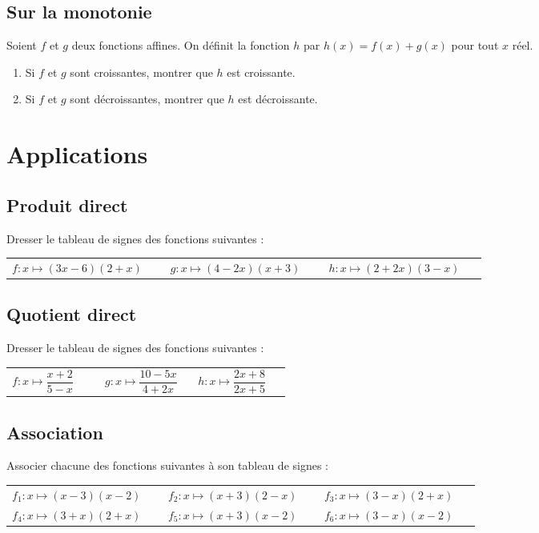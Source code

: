 \documentclass[oneside,12pt]{article}          %
\begin{document}
\subsection{Sur la monotonie}
Soient $f$ et $g$ deux fonctions affines. On définit la fonction $h$ par $h(x)=f(x)+g(x)$ pour tout $x$ réel.
\begin{enumerate}
	\item Si $f$ et $g$ sont croissantes, montrer que $h$ est croissante.
	\item Si $f$ et $g$ sont décroissantes, montrer que $h$ est décroissante.
\end{enumerate}



\section{Applications}

\subsection{Produit direct}
Dresser le tableau de signes des fonctions suivantes :

\begin{tabular}{p{0.3\linewidth} p{0.3\linewidth} p{0.3\linewidth}}
$f:x\mapsto (3x-6)(2+x)$ & $g:x\mapsto (4-2x)(x+3)$ & $h:x\mapsto (2+2x)(3-x)$
\end{tabular}



\subsection{Quotient direct}
Dresser le tableau de signes des fonctions suivantes :

\begin{tabular}{p{0.3\linewidth} p{0.3\linewidth} p{0.3\linewidth}}
$f:x\mapsto \dfrac{x+2}{5-x}$ & $g:x\mapsto \dfrac{10-5x}{4+2x}$ & $h:x\mapsto \dfrac{2x+8}{2x+5}$
\end{tabular}



\subsection{Association}
Associer chacune des fonctions suivantes à son tableau de signes :

\begin{tabular}{p{0.3\linewidth} p{0.3\linewidth} p{0.3\linewidth}}
$f_1:x\mapsto (x-3)(x-2)$ & $f_2:x\mapsto (x+3)(2-x)$ & $f_3:x\mapsto (3-x)(2+x)$ \\
$f_4:x\mapsto (3+x)(2+x)$ & $f_5:x\mapsto (x+3)(x-2)$ & $f_6:x\mapsto (3-x)(x-2)$
\end{tabular}
\end{document}
